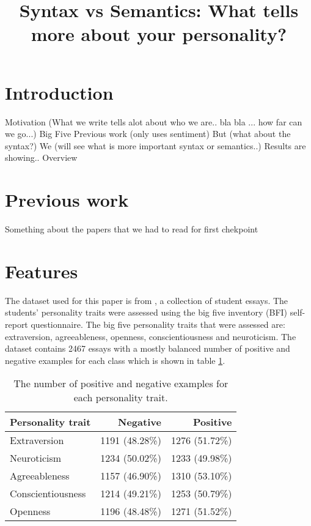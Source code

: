 \documentclass[10pt, a4paper]{article}
\title{Syntax vs Semantics: What tells more about your personality?}
\begin{document}
\maketitleabstract

\section{Introduction}
Motivation (What we write tells alot about who we are.. bla bla ... how far can we go...)
Big Five
Previous work (only uses sentiment)
But (what about the syntax?)
We (will see what is more important syntax or semantics..)
Results are showing..
Overview

\section{Previous work}
Something about the papers that we had to read for first chekpoint

\section{Features}

The dataset used for this paper is from \cite{pennebaker}, a collection of student essays.
The students' personality traits were assessed using the big five inventory (BFI) self-report questionnaire.
The big five personality traits that were assessed are: extraversion, agreeableness, openness, conscientiousness and neuroticism.
The dataset contains 2467  essays with a mostly balanced number of positive and negative examples for each class which is shown in table \ref{positive negative examples}.

\begin{table}[H]
	\begin{tabular}{lrr}
		\hline
		Personality trait & Negative & Positive \\ \hline
		Extraversion                                  & 1191 (48.28\%)                         & 1276 (51.72\%)                         \\
		Neuroticism                                  & 1234 (50.02\%)                         & 1233 (49.98\%)                         \\
		Agreeableness                                  & 1157 (46.90\%)                         & 1310 (53.10\%)                         \\
		Conscientiousness                                  & 1214 (49.21\%)                         & 1253 (50.79\%)                         \\
		Openness                                  & 1196 (48.48\%)                         & 1271 (51.52\%)                         \\ \hline
	\end{tabular}
	\caption{The number of positive and negative examples for each personality trait.}
	\label{positive negative examples}
\end{table}
\end{document}
